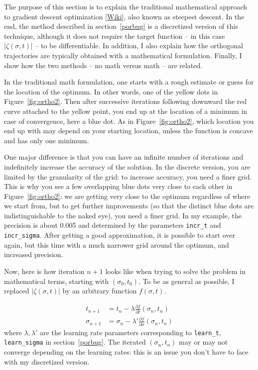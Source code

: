 \documentclass[oneside,10pt]{book}
\begin{document}
The purpose of this section is to explain the traditional mathematical approach to
 \textcolor{index}{gradient descent} optimization [\href{https://en.wikipedia.org/wiki/Gradient_descent}{Wiki}],
 also known as \textcolor{index}{steepest descent}. In the end, the method described
 in section~\ref{porbug} is a discretized version of this technique, although it does not require the target function -- in this case $|\zeta(\sigma,t)|$ --
 to be differentiable. In addition, I also explain how the orthogonal trajectories are typically obtained with a mathematical formulation. Finally, I show how the two methods -- no math versus math -- are related.

In the traditional math formulation, one starts with a rough estimate or guess for the location of the optimum. In other words, one of the yellow dots
 in Figure~\ref{fig:ortho2}. Then after successive iterations following downward the red curve attached to the yellow point, you end up at the location of a minimum in case of convergence, here a blue dot. As in Figure~\ref{fig:ortho2}, which location you end up with may depend on your starting location, unless the function is concave and has only one minimum.

One major difference is that you can have an infinite number
 of iterations and indefinitely increase the accuracy of the solution. In the discrete version, you are limited by the granularity of the grid: to increase accuracy, you need a finer grid. This is why you see a few overlapping blue dots very close to each other in Figure~\ref{fig:ortho2}: we are getting very close to the optimum regardless of where we start from, but to get further improvements (so that the distinct blue dots are indistinguishable to the naked eye), you need a finer grid.  In my example, the precision is about 0.005 and determined by the parameters
\texttt{incr\_t} and \texttt{incr\_sigma}. After getting a good approximation, it is possible to start over again, but this time with a much narrower grid around the optimum, and increased precision.

Now, here is how iteration $n+1$ looks like when trying to solve the problem in mathematical terms, starting with $(\sigma_0,t_0)$. To be as general as possible, I replaced $|\zeta(\sigma,t)|$ by an arbitrary function $f(\sigma,t)$.

$$
\begin{aligned}
      t_{n+1} & = t_n - \lambda \frac{\partial f}{\partial t} (\sigma_n, t_n)\\
      \sigma_{n+1} & = \sigma_n - \lambda' \frac{\partial f}{\partial \sigma} (\sigma_n, t_n)
\end{aligned}
$$
where $\lambda,\lambda'$ are the learning rate parameters corresponding to \texttt{learn\_t}, \texttt{learn\_sigma} in section~\ref{porbug}.
The iterated $(\sigma_n,t_n)$ may or may not converge depending on the learning rates: this is an issue you don't have to face with my
 discretized version.
\end{document}

